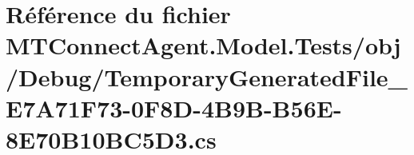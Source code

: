 \hypertarget{_m_t_connect_agent_8_model_8_tests_2obj_2_debug_2_temporary_generated_file___e7_a71_f73-0_f8_d-4cdc50ed4fc85e42f6d1f282c09f3a4ff}{}\section{Référence du fichier M\+T\+Connect\+Agent.\+Model.\+Tests/obj/\+Debug/\+Temporary\+Generated\+File\+\_\+\+E7\+A71\+F73-\/0\+F8\+D-\/4\+B9\+B-\/\+B56\+E-\/8\+E70\+B10\+B\+C5\+D3.cs}
\label{_m_t_connect_agent_8_model_8_tests_2obj_2_debug_2_temporary_generated_file___e7_a71_f73-0_f8_d-4cdc50ed4fc85e42f6d1f282c09f3a4ff}
